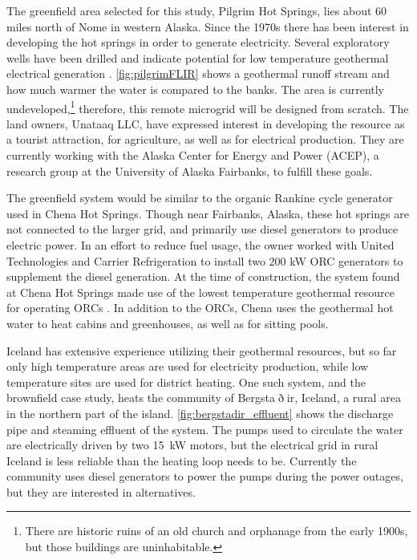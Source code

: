The greenfield area selected for this study, Pilgrim Hot Springs, lies about 60 miles north of Nome in western Alaska. Since the 1970s there has been interest in developing the hot springs in order to generate electricity.  Several exploratory wells have been drilled and indicate potential for low temperature geothermal electrical generation \cite{Holdmann2013}. \autoref{fig:pilgrimFLIR} shows a geothermal runoff stream and how much warmer the water is compared to the banks. The area is currently undeveloped,\footnote{There are historic ruins of an old church and orphanage from the early 1900s, but those buildings are uninhabitable.} therefore, this remote microgrid will be designed from scratch. The land owners, Unataaq LLC, have expressed interest in developing the resource as a tourist attraction, for agriculture, as well as for electrical production. They are currently working with the Alaska Center for Energy and Power (ACEP), a research group at the University of Alaska Fairbanks, to fulfill these goals. 


The greenfield system would be similar to the organic Rankine cycle generator used in Chena Hot Springs. Though near Fairbanks, Alaska, these hot springs are not connected to the larger grid, and primarily use diesel generators to produce electric power. In an effort to reduce fuel usage, the owner worked with United Technologies and Carrier Refrigeration to install two 200 kW ORC generators to supplement the diesel generation. At the time of construction, the system found at Chena Hot Springs made use of the lowest temperature geothermal resource for operating ORCs \cite{Holdmann2007}. In addition to the ORCs, Chena uses the geothermal hot water to heat cabins and greenhouses, as well as for sitting pools. 

Iceland has extensive experience utilizing their geothermal resources, but so far only high temperature areas are used for electricity production, while low temperature sites are used for district heating. One such system, and the brownfield case study, heats the community of Bergsta$\eth$ir, Iceland, a rural area in the northern part of the island. \autoref{fig:bergstadir_effluent} shows the discharge pipe and steaming effluent of the system. The pumps used to circulate the water are electrically driven by two \SI{15}{\kilo\watt} motors, but the electrical grid in rural Iceland is less reliable than the heating loop needs to be. Currently the community uses diesel generators to power the pumps during the power outages, but they are interested in alternatives.


